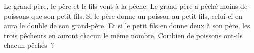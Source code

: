 \documentclass[exercice]{thedocument}%
\begin{document}
%
Le grand-père, le père et le fils vont à la pêche. Le grand-père a pêché moins
de poissons que son petit-fils. Si le père donne un poisson au petit-fils,
celui-ci en aura le double de son grand-père. Et si le petit fils en donne
deux à son père, les trois pêcheurs en auront chacun le même nombre.\vskip10pt
\indent Combien de poissons ont-ils chacun pêchés~?
\end{document}
